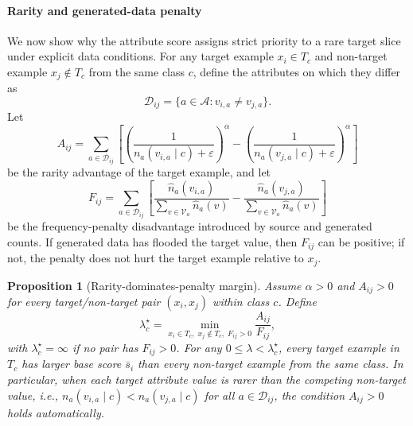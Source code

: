 \documentclass{article}
\newcommand{\attrs}{\mathcal{A}}
\newcommand{\vals}{\mathcal{V}}
\newtheorem{proposition}{Proposition}
\begin{document}
\paragraph{Rarity and generated-data penalty}
We now show why the attribute score assigns strict priority to a rare target slice under explicit data conditions. For any target example $x_i\in T_c$ and non-target example $x_j\notin T_c$ from the same class $c$, define the attributes on which they differ as
\begin{equation}
\label{eq:target-difference-attributes}
\mathcal{D}_{ij}=\{a\in\attrs: v_{i,a}\neq v_{j,a}\}.
\end{equation}
Let
\begin{equation}
\label{eq:rarity-advantage}
A_{ij}
=
\sum_{a\in\mathcal{D}_{ij}}
\left[
\left(\frac{1}{n_a(v_{i,a}\mid c)+\varepsilon}\right)^\alpha
-
\left(\frac{1}{n_a(v_{j,a}\mid c)+\varepsilon}\right)^\alpha
\right]
\end{equation}
be the rarity advantage of the target example, and let
\begin{equation}
\label{eq:frequency-disadvantage}
F_{ij}
=
\sum_{a\in\mathcal{D}_{ij}}
\left[
\frac{\hat{n}_a(v_{i,a})}{\sum_{v\in\vals_a}\hat{n}_a(v)}
-
\frac{\hat{n}_a(v_{j,a})}{\sum_{v\in\vals_a}\hat{n}_a(v)}
\right]
\end{equation}
be the frequency-penalty disadvantage introduced by source and generated counts. If generated data has flooded the target value, then $F_{ij}$ can be positive; if not, the penalty does not hurt the target example relative to $x_j$.

\begin{proposition}[Rarity-dominates-penalty margin]
\label{prop:rarity-margin}
Assume $\alpha>0$ and $A_{ij}>0$ for every target/non-target pair $(x_i,x_j)$ within class $c$. Define
\begin{equation}
\label{eq:lambda-star}
\lambda_c^\star
=
\min_{x_i\in T_c,\;x_j\notin T_c,\;F_{ij}>0}
\frac{A_{ij}}{F_{ij}},
\end{equation}
with $\lambda_c^\star=\infty$ if no pair has $F_{ij}>0$. For any $0\leq\lambda<\lambda_c^\star$, every target example in $T_c$ has larger base score $\bar{s}_i$ than every non-target example from the same class. In particular, when each target attribute value is rarer than the competing non-target value, i.e., $n_a(v_{i,a}\mid c)<n_a(v_{j,a}\mid c)$ for all $a\in\mathcal{D}_{ij}$, the condition $A_{ij}>0$ holds automatically.
\end{proposition}
\end{document}
